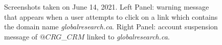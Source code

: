 \documentclass{article}
\begin{document}
\begin{figure}[h]
	\begin{center}
	\end{center}
	\caption{Screenshots taken on June 14, 2021. Left Panel: warning message that appears when a user attempts to click on a link which contains the domain name {\it globalresearch.ca}. Right Panel: account suspension message of $@CRG$\_$CRM$ linked to {\it globalresearch.ca}.  }
	\label{fig4bis}
\end{figure}



\end{document}
